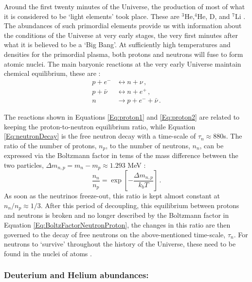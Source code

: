 \qquad Around the first twenty minutes of the Universe, the production of most of what it is considered to be `light elements' took place. These are $^3$He,$^4$He, D, and $^7$Li \citep{2007Steingman-BBN}. The abundances of such primordial elements provide us with information about the conditions of the Universe at very early stages, the very first minutes after what it is believed to be a `Big Bang'. At sufficiently high temperatures and densities for the primordial plasma, both protons and neutrons will fuse to form atomic nuclei. The main baryonic reactions at the very early Universe maintain chemical equilibrium, these are \citep[][p. 196]{2016Particle-Review,schneider_2016}:
\begin{align}
    p + e^- & \longleftrightarrow n + \nu \, , \label{Eq:proton1}\\
    p + \bar{\nu} & \longleftrightarrow n + e^+ \, ,\label{Eq:proton2}\\
    n & \rightarrow p + e^- + \bar{\nu}\, . \label{Eq:neutronDecay}
\end{align}

\qquad The reactions shown in Equations \eqref{Eq:proton1} and \eqref{Eq:proton2} are related to keeping the proton-to-neutron equilibrium ratio, while Equation \eqref{Eq:neutronDecay} is the free neutron decay with a time-scale of $\tau_n \approx 880$s. The ratio of the number of protons, $n_p$, to the number of neutrons, $n_n$, can be expressed via the Boltzmann factor in tems of the mass difference between the two particles, $\Delta m_{n,p} = m_n - m_p \approx 1.293$ MeV \citep{2015NeutronProtonRatio}:
\begin{equation}
    \frac{n_n}{n_p} = \exp\left[ - \frac{\Delta m_{n,p}}{k_b T}\right]\, .
    \label{Eq:BoltzFactorNeutronProton}
\end{equation}
As soon as the neutrinos freeze-out, this ratio is kept almost constant at $n_n/n_p \approx 1/3$. After this period of decoupling, this equilibrium between protons and neutrons is broken and no longer described by the Boltzmann factor in Equation \eqref{Eq:BoltzFactorNeutronProton}, the changes in this ratio are then governed to the decay of free neutrons on the above-mentioned time-scale, $\tau_n$. For neutrons to `survive' throughout the history of the Universe, these need to be found in the nuclei of atoms \citep{2007Steingman-BBN}.

\subsubsection{Deuterium and Helium abundances:}

